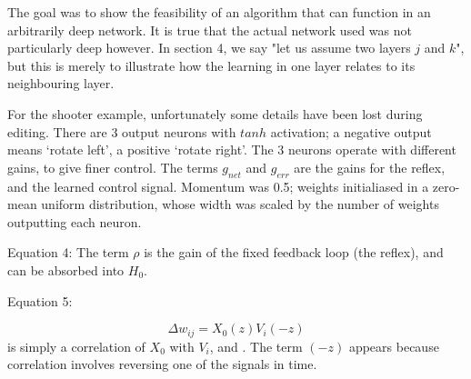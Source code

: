 \documentclass{article}
\begin{document}
	
	The goal was to show the feasibility of an algorithm that can function in an arbitrarily deep network. It is true that the actual network used was not particularly deep however. In section 4, we say "let us assume two layers $j$ and $k$", but this is merely to illustrate how the learning in one layer relates to its neighbouring layer.  
	
	For the shooter example, unfortunately some details have been lost during editing. There are 3 output neurons with $tanh$ activation; a negative output means ‘rotate left’, a positive ‘rotate right’. The 3 neurons operate with different gains, to give finer control. The terms $g_{net}$ and $g_{err}$ are the gains for the reflex, and the learned control signal.
	Momentum was 0.5; weights initialiased in a zero-mean uniform distribution, whose width was scaled by the number of weights outputting each neuron.
	
Equation 4: The term $\rho$ is the gain of the fixed feedback loop (the reflex), and can be absorbed into $H_{0}$. 
	
	
Equation 5:

\begin{equation}
\Delta w_{ij} = X_0(z) V_i(-z)
\end{equation}
is simply a correlation of $X_{0}$ with $V_{i}$, and . The term $(-z)$ appears because correlation involves reversing one of the signals in time. 

	
\end{document}
